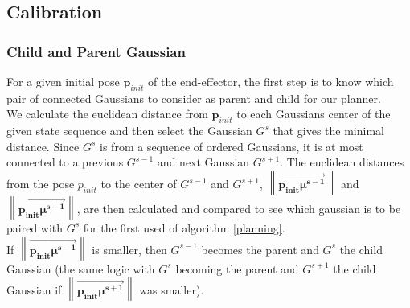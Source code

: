 \documentclass[letterpaper, 10 pt, conference]{ieeeconf}  %
\newcommand{\mb}[1]{{\boldsymbol{#1}}}
\newcommand\norm[1]{\left\lVert#1\right\rVert}
\begin{document}
\subsection{Calibration}
\subsubsection{Child and Parent Gaussian}\leavevmode\par
For a given initial pose $\mb{p}_{init}$ of the end-effector, the first step is to know which pair of connected Gaussians to consider as parent and child for our planner.\\
We calculate the euclidean distance from $\mb{p}_{init}$ to each Gaussians center of the given state sequence and then select the Gaussian $G^s$ that gives the minimal distance.
Since $G^{s}$ is from a sequence of ordered Gaussians, it is at most connected to a previous $G^{s-1}$ and next Gaussian $G^{s+1}$.  The euclidean distances from the pose $p_{init}$ to the center of $G^{s-1}$ and $G^{s+1}$, $\norm{\overrightarrow{\mb{p_{init}}\mb{\mu^{s-1}}}}$ and $\norm{\overrightarrow{\mb{p_{init}}\mb{\mu^{s+1}}}}$, are then calculated and compared to see which gaussian is to be paired with $G^s$ for the first used of algorithm \ref{planning}.\\
If $\norm{\overrightarrow{\mb{p_{init}}\mb{\mu^{s-1}}}}$ is smaller, then $G^{s-1}$ becomes the parent and $G^{s}$ the child Gaussian (the same logic with  $G^{s}$ becoming the parent and $G^{s+1}$ the child Gaussian if $\norm{\overrightarrow{\mb{p_{init}}\mb{\mu^{s+1}}}}$ was smaller).\\
\end{document}

